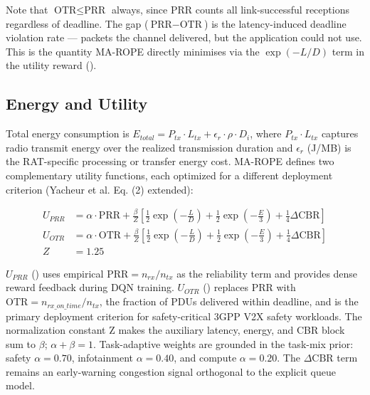 Note that $\text{OTR} \leq \text{PRR}$ always, since PRR counts all link-successful receptions regardless of deadline. The gap ($\text{PRR} - \text{OTR}$) is the latency-induced deadline violation rate --- packets the channel delivered, but the application could not use. This is the quantity MA-ROPE directly minimises via the $\exp(-L/D)$ term in the utility reward ().

\subsection{Energy and Utility}

Total energy consumption is $E_{total} = P_{tx} \cdot L_{tx} + \epsilon_r \cdot \rho \cdot D_i$, where $P_{tx} \cdot L_{tx}$ captures radio transmit energy over the realized transmission duration and $\epsilon_r$ (J/MB) is the RAT-specific processing or transfer energy cost. MA-ROPE defines two complementary utility functions, each optimized for a different deployment criterion (Yacheur et al. \cite{yacheur2023} Eq. (2) extended):

\begin{subequations}
\label{eq:utility_all}
\begin{align}
U_{PRR} &= \alpha \cdot \text{PRR} + \frac{\beta}{Z} \left[ \frac{1}{2}\exp\left(-\frac{L}{D}\right) + \frac{1}{2}\exp\left(-\frac{E}{3}\right) + \frac{1}{4}\Delta\text{CBR} \right] \label{eq:uprr} \\
U_{OTR} &= \alpha \cdot \text{OTR} + \frac{\beta}{Z} \left[ \frac{1}{2}\exp\left(-\frac{L}{D}\right) + \frac{1}{2}\exp\left(-\frac{E}{3}\right) + \frac{1}{4}\Delta\text{CBR} \right] \label{eq:uotr} \\
Z &= 1.25 \label{eq:z}
\end{align}
\end{subequations}

$U_{PRR}$ () uses empirical $\text{PRR} = n_{rx}/n_{tx}$ as the reliability term and provides dense reward feedback during DQN training. $U_{OTR}$ () replaces PRR with $\text{OTR} = n_{rx\_on\_time}/n_{tx}$, the fraction of PDUs delivered within deadline, and is the primary deployment criterion for safety-critical 3GPP V2X safety workloads. The normalization constant Z makes the auxiliary latency, energy, and CBR block sum to $\beta$; $\alpha + \beta = 1$. Task-adaptive weights are grounded in the task-mix prior: safety $\alpha=0.70$, infotainment $\alpha=0.40$, and compute $\alpha=0.20$. The $\Delta\text{CBR}$ term remains an early-warning congestion signal orthogonal to the explicit queue model.

